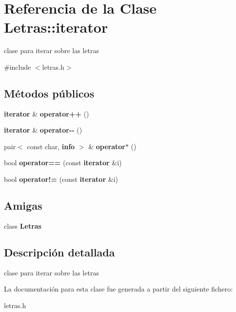 \section{Referencia de la Clase Letras\+:\+:iterator}
\label{classLetras_1_1iterator}


clase para iterar sobre las letras  




{\ttfamily \#include $<$letras.\+h$>$}

\subsection*{Métodos públicos}
\begin{DoxyCompactItemize}
\item 
\mbox{\label{classLetras_1_1iterator_a17a9f16bc61e9b9f860923fa623d1e7f}} 
\textbf{ iterator} \& {\bfseries operator++} ()
\item 
\mbox{\label{classLetras_1_1iterator_a7a6c01dab9a67464457403ec044a8135}} 
\textbf{ iterator} \& {\bfseries operator-\/-\/} ()
\item 
\mbox{\label{classLetras_1_1iterator_a952d13287a9435764ee98653778d3d7d}} 
pair$<$ const char, \textbf{ info} $>$ \& {\bfseries operator$\ast$} ()
\item 
\mbox{\label{classLetras_1_1iterator_a1ec9d3aad990986b2b09942edac0976b}} 
bool {\bfseries operator==} (const \textbf{ iterator} \&i)
\item 
\mbox{\label{classLetras_1_1iterator_afd5eed2a6f6397c4abc72d08747c5394}} 
bool {\bfseries operator!=} (const \textbf{ iterator} \&i)
\end{DoxyCompactItemize}
\subsection*{Amigas}
\begin{DoxyCompactItemize}
\item 
\mbox{\label{classLetras_1_1iterator_a63063318eace5c2412fd3a23b9efb409}} 
class {\bfseries Letras}
\end{DoxyCompactItemize}


\subsection{Descripción detallada}
clase para iterar sobre las letras 

La documentación para esta clase fue generada a partir del siguiente fichero\+:\begin{DoxyCompactItemize}
\item 
letras.\+h\end{DoxyCompactItemize}
